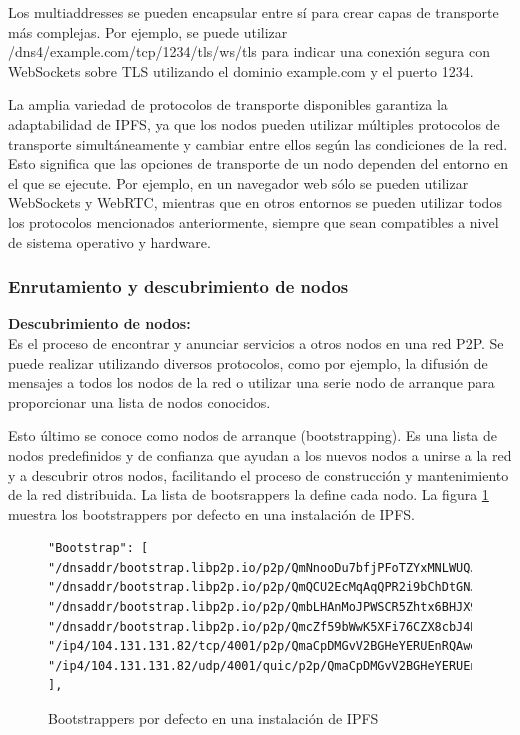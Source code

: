Los multiaddresses se pueden encapsular entre sí para crear capas de transporte más complejas. Por ejemplo, se puede utilizar /dns4/example.com/tcp/1234/tls/ws/tls para indicar una conexión segura con WebSockets sobre TLS utilizando el dominio example.com y el puerto 1234.

La amplia variedad de protocolos de transporte disponibles garantiza la adaptabilidad de IPFS, ya que los nodos pueden utilizar múltiples protocolos de transporte simultáneamente y cambiar entre ellos según las condiciones de la red. Esto significa que las opciones de transporte de un nodo dependen del entorno en el que se ejecute. Por ejemplo, en un navegador web sólo se pueden utilizar WebSockets y WebRTC, mientras que en otros entornos se pueden utilizar todos los protocolos mencionados anteriormente, siempre que sean compatibles a nivel de sistema operativo y hardware.

\subsubsection{Enrutamiento y descubrimiento de nodos}
\textbf{Descubrimiento de nodos:}
\\Es el proceso de encontrar y anunciar servicios a otros nodos en una red P2P. Se puede realizar utilizando diversos protocolos,
como por ejemplo, la difusión de mensajes a todos los nodos de la red o utilizar una serie nodo de arranque para proporcionar una lista de nodos conocidos.

Esto último se conoce como nodos de arranque (bootstrapping). Es una lista de nodos predefinidos  y de confianza que ayudan a los nuevos nodos a unirse a la red y a descubrir otros nodos, facilitando el proceso de construcción y mantenimiento de la red distribuida. La lista de bootsrappers la define cada nodo. La figura \ref{fig:ipfsbootsrapper} muestra los bootstrappers por defecto en una instalación de IPFS.

\begin{figure}[H]
      \centering
      \small
      \begin{verbatim}
"Bootstrap": [
"/dnsaddr/bootstrap.libp2p.io/p2p/QmNnooDu7bfjPFoTZYxMNLWUQJyrVwtbZg5gBMjTezGAJN",
"/dnsaddr/bootstrap.libp2p.io/p2p/QmQCU2EcMqAqQPR2i9bChDtGNJchTbq5TbXJJ16u19uLTa",
"/dnsaddr/bootstrap.libp2p.io/p2p/QmbLHAnMoJPWSCR5Zhtx6BHJX9KiKNN6tpvbUcqanj75Nb",
"/dnsaddr/bootstrap.libp2p.io/p2p/QmcZf59bWwK5XFi76CZX8cbJ4BhTzzA3gU1ZjYZcYW3dwt",
"/ip4/104.131.131.82/tcp/4001/p2p/QmaCpDMGvV2BGHeYERUEnRQAwe3N8SzbUtfsmvsqQLuvuJ",
"/ip4/104.131.131.82/udp/4001/quic/p2p/QmaCpDMGvV2BGHeYERUEnRQAwe3N8SzbUtfsmvsqQLuvuJ"
],
      \end{verbatim}
      \caption{Bootstrappers por defecto en una instalación de IPFS}
      \label{fig:ipfsbootsrapper}
\end{figure}

